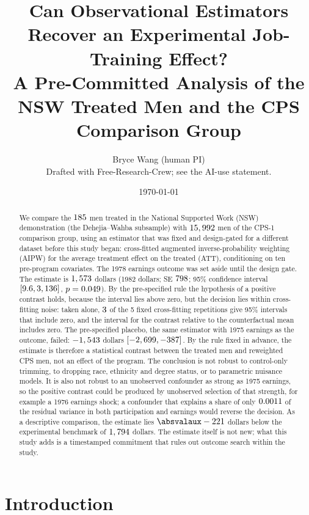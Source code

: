 \documentclass[11pt]{article}
\title{Can Observational Estimators Recover an Experimental Job-Training Effect?\\
A Pre-Committed Analysis of the NSW Treated Men and the CPS Comparison Group}
\author{Bryce Wang (human PI) \\ \small Drafted with Free-Research-Crew; see the AI-use statement.}
\date{\today}
\def\absvalaux-#1\relax{#1}
\newcommand{\absval}[1]{\expandafter\absvalaux#1\relax}
\newcommand{\ci}[2]{$[#1, #2]$}
\begin{document}
\maketitle

\begin{abstract}
We compare the $185$ men treated in the National Supported Work (NSW)
demonstration (the Dehejia--Wahba subsample) with $15,992$ men of the CPS-1
comparison group, using an estimator that was fixed and design-gated for a different dataset
before this study began: cross-fitted augmented inverse-probability weighting (AIPW) for the
average treatment effect on the treated (ATT), conditioning on ten pre-program covariates.
The 1978 earnings outcome was set aside until the design gate. The estimate is
$1,573$ dollars (1982 dollars; SE $798$; 95\% confidence interval
\ci{\PrimaryCiLow}{\PrimaryCiHigh}, $p = 0.049$). By the pre-specified rule the
hypothesis of a positive contrast holds, because the interval lies above zero, but the
decision lies within cross-fitting noise: taken alone, $3$ of the 5
fixed cross-fitting repetitions give 95\% intervals that include zero, and the interval for
the contrast relative to the counterfactual mean includes zero. The pre-specified placebo,
the same estimator with 1975 earnings as the outcome, failed: $-1,543$ dollars
\ci{\PlaceboCiLow}{\PlaceboCiHigh}. By the rule fixed in advance, the estimate is therefore a
statistical contrast between the treated men and reweighted CPS men, not an effect of the
program. The conclusion is not robust to control-only trimming, to dropping race, ethnicity
and degree status, or to parametric nuisance models. It is also not robust to an unobserved
confounder as strong as 1975 earnings, so the positive contrast could be produced by
unobserved selection of that strength, for example a 1976 earnings shock; a confounder that
explains a share of only $0.0011$ of the residual variance in both participation and
earnings would reverse the decision. As a descriptive comparison, the estimate lies
$\absval{\HTwoDiff}$ dollars below the experimental benchmark of $1,794$
dollars. The estimate itself is not new; what this study adds is a timestamped commitment
that rules out outcome search within the study.
\end{abstract}

\section{Introduction}
\end{document}
